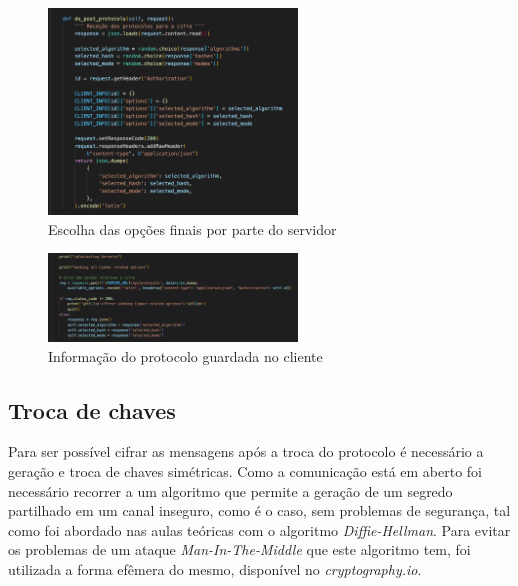 \documentclass[10pt,english]{article}
\begin{document}
\begin{figure}[!h]
        \centering
        \includegraphics[width=250]{images/cipher_suite_decision_server.png}
        \caption{Escolha das opções finais por parte do servidor}
\end{figure}

\begin{figure}[!h]
        \centering
        \includegraphics[width=250]{images/cipher_suite_save_client.png}
        \caption{Informação do protocolo guardada no cliente}
\end{figure}

\subsection{Troca de chaves}

\par Para ser possível cifrar as mensagens após a troca do protocolo é necessário a geração e troca de chaves simétricas. Como a comunicação está em aberto foi necessário recorrer a um algoritmo que permite a geração de um segredo partilhado em um canal inseguro, como é o caso, sem problemas de segurança, tal como foi abordado nas aulas teóricas com o algoritmo \textit{Diffie-Hellman}. Para evitar os problemas de um ataque \textit{Man-In-The-Middle} que este algoritmo tem, foi utilizada a forma efêmera do mesmo, disponível no \textit{cryptography.io}.
\end{document}
